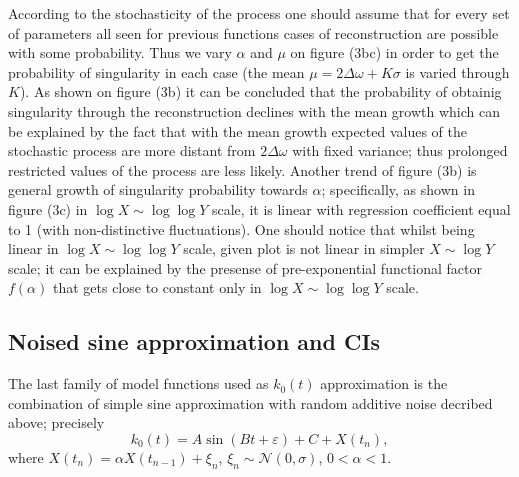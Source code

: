\documentclass{ws-ijbc}
\begin{document}
According to the stochasticity of the process one should assume that
for every set of parameters all seen for previous functions cases
of reconstruction are possible with some probability. Thus we vary
$\alpha$ and $\mu$ on figure (3b\textendash c) in order to get the
probability of singularity in each case (the mean $\mu=2\Delta\omega+K\sigma$
is varied through $K$). As shown on figure (3b) it can be concluded
that the probability of obtainig singularity through the reconstruction
declines with the mean growth which can be explained by the fact that
with the mean growth expected values of the stochastic process are
more distant from $2\Delta\omega$ with fixed variance; thus prolonged
restricted values of the process are less likely. Another trend of
figure (3b) is general growth of singularity probability towards $\alpha$;
specifically, as shown in figure (3c) in $\log X\sim\log\log Y$ scale,
it is linear with regression coefficient equal to 1 (with non-distinctive
fluctuations). One should notice that whilst being linear in $\log X\sim\log\log Y$
scale, given plot is not linear in simpler $X\sim\log Y$ scale; it
can be explained by the presense of pre-exponential functional factor
$f(\alpha)$ that gets close to constant only in $\log X\sim\log\log Y$
scale.

\subsection{Noised sine approximation and CIs}

The last family of model functions used as $k_{0}(t)$ approximation
is the combination of simple sine approximation with random additive
noise decribed above; precisely
\[
k_{0}(t)=A\sin(Bt+\varepsilon)+C+X(t_{n}),
\]
where $X(t_{n})=\alpha X(t_{n-1})+\xi_{n}$, $\xi_{n}\sim\mathcal{N}(0,\sigma)$,
$0<\alpha<1$.
\end{document}
